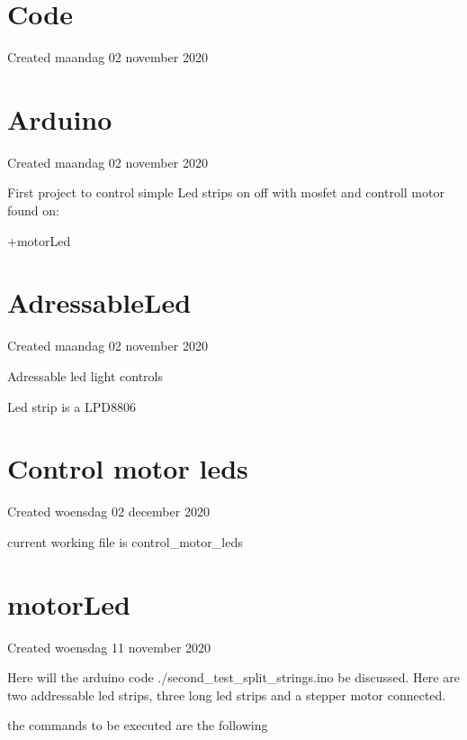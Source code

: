 \documentclass{article}
\begin{document}
		\section{Code}

Created maandag 02 november 2020




		\section{Arduino}

Created maandag 02 november 2020



First project to control simple Led strips on off with mosfet and controll motor found on:

+motorLed






		\section{AdressableLed}

Created maandag 02 november 2020



Adressable led light controls



Led strip is a LPD8806


		\section{Control motor leds}

Created woensdag 02 december 2020



current working file is control\_motor\_leds






		\section{motorLed}

Created woensdag 11 november 2020



Here will the arduino code ./second\_test\_split\_strings.ino be discussed. Here are two addressable led strips, three long led strips and a stepper motor connected. 



the commands to be executed are the following
\end{document}
